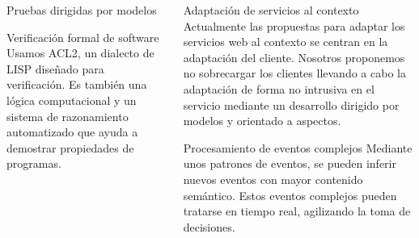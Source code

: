 \documentclass[usepdftitle=false,xcolor={svgnames}]{beamer}
\begin{document}
\begin{frame}{}
\begin{columns}[T]
\begin{column}{.45\textwidth}
\begin{block}{Pruebas dirigidas por modelos}
        \begin{center}
          
        \end{center}
      \end{block}

      \vspace{-.18em}

      \begin{block}{Verificación formal de software}
        \small Usamos ACL2, un dialecto de LISP diseñado para
        verificación. Es también una lógica computacional y un sistema
        de razonamiento automatizado que ayuda a demostrar propiedades
        de programas.

        \begin{center}
          \begin{tabular}{c}
            
          \end{tabular}
        \end{center}
      \end{block}
    \end{column}
    
    \begin{column}{.45\textwidth}
      \begin{block}{Adaptación de servicios al contexto}
        \small Actualmente las propuestas para adaptar los servicios
        web al contexto se centran en la adaptación del
        cliente. Nosotros proponemos no sobrecargar los clientes
        llevando a cabo la adaptación de forma no intrusiva en el
        servicio mediante un desarrollo dirigido por modelos y
        orientado a aspectos.

        \vspace{.5em}

        \begin{center}
          \scriptsize {}
          
        \end{center}
      \end{block}

      \vspace{-.15em}

      \begin{block}{Procesamiento de eventos complejos}
        \small Mediante unos patrones de eventos, se pueden inferir
        nuevos eventos con mayor contenido semántico.  Estos eventos
        complejos pueden tratarse en tiempo real, agilizando la toma
        de decisiones.


\end{block}
\end{column}
\end{columns}
\end{frame}
\end{document}
